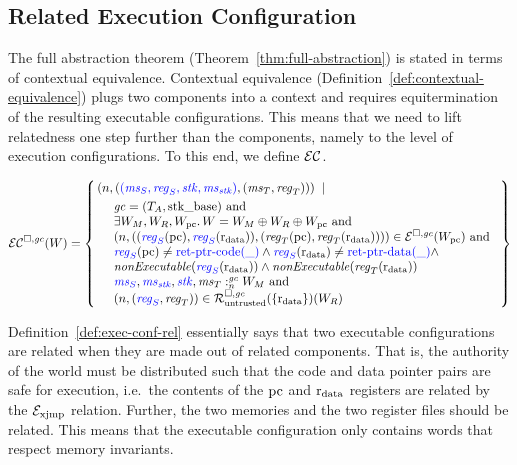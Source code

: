 \begin{jversion}
\subsection{Related Execution Configuration}
The full abstraction theorem (Theorem~\ref{thm:full-abstraction}) is stated in terms of contextual equivalence.
Contextual equivalence (Definition~\ref{def:contextual-equivalence}) plugs two components into a context and requires equitermination of the resulting executable configurations.
This means that we need to lift relatedness one step further than the components, namely to the level of execution configurations.
To this end, we define $\mathcal{EC}$.
\begin{definition}
\label{def:exec-conf-rel}
  \[
  \lrec(W) = \left\{
    \begin{multlined}
\npair{\left(
        \src{(\ms_S,\reg_S,\stk,\ms_\stk)},
        (\ms_T,\reg_T)\right)} \; \mid \; \\
    \begin{array}{l}
      \gc = (\ta,\stkb) \tand\\
      \exists W_M,W_R,W_\pcreg \ldotp W = W_M \oplus W_R \oplus W_\pcreg \tand\\
      \npair{( (\src{\reg_S}(\pcreg),\src{\reg_S}(\rdata)), (\reg_T(\pcreg),\reg_T(\rdata)) )} \in \lrexj(W_\pcreg) \tand \\
      \src{\reg_S}(\pcreg) \neq \src{\retptrc(\_)} \wedge 
      \src{\reg_S}(\rdata) \neq \src{\retptrd(\_)} \wedge \\
      \nonExec{\src{\reg_S}(\rdata)} \wedge
      \nonExec{\reg_T(\rdata)}\\
      \memSat{\src{\ms_S},\src{\ms_\stk},\src{\stk},\ms_T}{W_M} \tand\\
      \npair{\stpair{\reg}{\reg}} \in \lrr(\{\rdata\})(W_R)
    \end{array}
  \end{multlined}
\right\}
\]
\end{definition}
Definition~\ref{def:exec-conf-rel} essentially says that two executable configurations are related when they are made out of related components.
That is, the authority of the world must be distributed such that the code and data pointer pairs are safe for execution, i.e.\ the contents of the $\mathrm{pc}$ and $\mathrm{r}_\mathrm{data}$ registers are related by the $\mathcal{E}_\mathrm{xjmp}$ relation.
Further, the two memories and the two register files should be related.
This means that the executable configuration only contains words that respect memory invariants.

\end{jversion}

